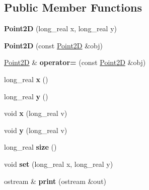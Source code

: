 \subsection*{Public Member Functions}
\begin{DoxyCompactItemize}
\item 
\mbox{\label{classez_1_1maths_1_1Point2D_a05a92b35da303a3f8418922c9d544168}} 
{\bfseries Point2D} (long\+\_\+real x, long\+\_\+real y)
\item 
\mbox{\label{classez_1_1maths_1_1Point2D_ae46bfb1b754a226568342a04451cc237}} 
{\bfseries Point2D} (const \hyperlink{classez_1_1maths_1_1Point2D}{Point2D} \&obj)
\item 
\mbox{\label{classez_1_1maths_1_1Point2D_ac076a1095d1c1bb340e2ffba9dde1352}} 
\hyperlink{classez_1_1maths_1_1Point2D}{Point2D} \& {\bfseries operator=} (const \hyperlink{classez_1_1maths_1_1Point2D}{Point2D} \&obj)
\item 
\mbox{\label{classez_1_1maths_1_1Point2D_a6354ed6819a28105b8a89734e6eba98d}} 
long\+\_\+real {\bfseries x} ()
\item 
\mbox{\label{classez_1_1maths_1_1Point2D_a14caedf448a8e16629524a1fb52d9ce6}} 
long\+\_\+real {\bfseries y} ()
\item 
\mbox{\label{classez_1_1maths_1_1Point2D_aa1c73590e5528f1e2e3555fbd9ee1e39}} 
void {\bfseries x} (long\+\_\+real v)
\item 
\mbox{\label{classez_1_1maths_1_1Point2D_a99a76f1f88eef85cf55372e4a3f4b580}} 
void {\bfseries y} (long\+\_\+real v)
\item 
\mbox{\label{classez_1_1maths_1_1Point2D_af6090290a774e86750702cd788e9b96d}} 
long\+\_\+real {\bfseries size} ()
\item 
\mbox{\label{classez_1_1maths_1_1Point2D_a3cffdc22b6c0df944ce43297bbcce422}} 
void {\bfseries set} (long\+\_\+real x, long\+\_\+real y)
\item 
\mbox{\label{classez_1_1maths_1_1Point2D_af82e66cc2b5825ae65495a4723524688}} 
ostream \& {\bfseries print} (ostream \&out)
\end{DoxyCompactItemize}
